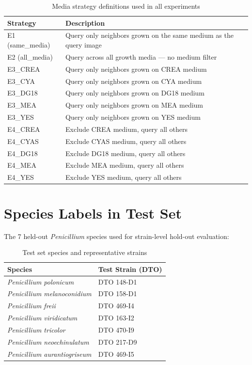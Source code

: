 \begin{table}[H]
\centering
\caption{Media strategy definitions used in all experiments}
\label{tab:env_strategies}
\small
\begin{tabular}{@{}l p{10cm}@{}}
\toprule
\textbf{Strategy} & \textbf{Description} \\
\midrule
E1 (same\_media) & Query only neighbors grown on the same medium as the query image \\
E2 (all\_media)  & Query across all growth media --- no medium filter \\
E3\_CREA & Query only neighbors grown on CREA medium \\
E3\_CYA  & Query only neighbors grown on CYA medium \\
E3\_DG18 & Query only neighbors grown on DG18 medium \\
E3\_MEA  & Query only neighbors grown on MEA medium \\
E3\_YES  & Query only neighbors grown on YES medium \\
E4\_CREA & Exclude CREA medium, query all others \\
E4\_CYAS & Exclude CYAS medium, query all others \\
E4\_DG18 & Exclude DG18 medium, query all others \\
E4\_MEA  & Exclude MEA medium, query all others \\
E4\_YES  & Exclude YES medium, query all others \\
\bottomrule
\end{tabular}
\end{table}

\section{Species Labels in Test Set}

The 7 held-out \textit{Penicillium} species used for strain-level hold-out evaluation:

\begin{table}[H]
\centering
\caption{Test set species and representative strains}
\label{tab:test_species}
\small
\begin{tabular}{@{}l l@{}}
\toprule
\textbf{Species} & \textbf{Test Strain (DTO)} \\
\midrule
\textit{Penicillium polonicum} & DTO 148-D1 \\
\textit{Penicillium melanoconidium} & DTO 158-D1 \\
\textit{Penicillium freii} & DTO 469-I4 \\
\textit{Penicillium viridicatum} & DTO 163-I2 \\
\textit{Penicillium tricolor} & DTO 470-I9 \\
\textit{Penicillium neoechinulatum} & DTO 217-D9 \\
\textit{Penicillium aurantiogriseum} & DTO 469-I5 \\
\bottomrule
\end{tabular}
\end{table}

